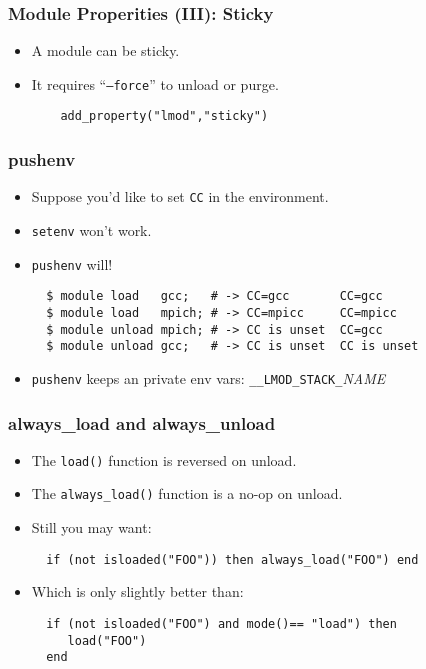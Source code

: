 \documentclass{beamer}
\begin{document}
\begin{frame}[fragile]
    \frametitle{Module Properities (III): Sticky}
  \begin{itemize}
    \item A module can be sticky.
    \item It requires ``\texttt{--force}'' to unload or purge.
    {\small
\begin{verbatim}
    add_property("lmod","sticky")
\end{verbatim}
}
  \end{itemize}
\end{frame}





\begin{frame}[fragile]
    \frametitle{pushenv}
  \begin{itemize}
    \item Suppose you'd like to set \texttt{CC} in the environment.
    \item \texttt{setenv} won't work.
    \item \texttt{pushenv} will!
    {\small
\begin{verbatim}
  $ module load   gcc;   # -> CC=gcc       CC=gcc
  $ module load   mpich; # -> CC=mpicc     CC=mpicc
  $ module unload mpich; # -> CC is unset  CC=gcc
  $ module unload gcc;   # -> CC is unset  CC is unset
\end{verbatim}
}
    \item \texttt{pushenv} keeps an private env vars: \texttt{\_\_LMOD\_STACK\_}\emph{NAME}
  \end{itemize}
\end{frame}

\begin{frame}[fragile]
    \frametitle{always\_load and always\_unload}
  \begin{itemize}
    \item The \texttt{load()} function is reversed on unload.
    \item The \texttt{always\_load()} function is a no-op on unload.
    \item Still you may want:
    {\small
\begin{verbatim}
  if (not isloaded("FOO")) then always_load("FOO") end
\end{verbatim}
}
    \item Which is only slightly better than:
    {\small
\begin{verbatim}
  if (not isloaded("FOO") and mode()== "load") then
     load("FOO")
  end
\end{verbatim}
}
  \end{itemize}
\end{frame}
\end{document}

